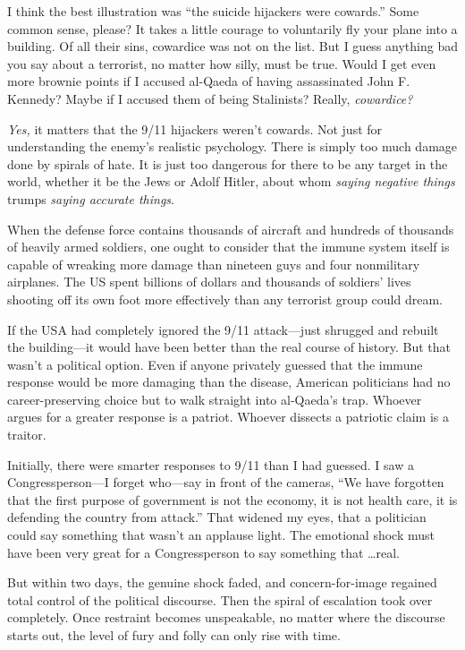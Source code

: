 {
 I think the best illustration was ``the suicide
hijackers were cowards.'' Some common sense, please?
It takes a little courage to voluntarily fly your plane into a
building. Of all their sins, cowardice was not on the list. But I guess
anything bad you say about a terrorist, no matter how silly, must be
true. Would I get even more brownie points if I accused al-Qaeda of
having assassinated John F. Kennedy? Maybe if I accused them of being
Stalinists? Really, \textit{cowardice?}}

{
 \textit{Yes,} it matters that the 9/11 hijackers
weren't cowards. Not just for understanding the
enemy's realistic psychology. There is simply too much
damage done by spirals of hate. It is just too dangerous for there to
be any target in the world, whether it be the Jews or Adolf Hitler,
about whom \textit{saying negative things} trumps \textit{saying
accurate things}.}

{
 When the defense force contains thousands of aircraft and hundreds
of thousands of heavily armed soldiers, one ought to consider that the
immune system itself is capable of wreaking more damage than nineteen
guys and four nonmilitary airplanes. The US spent billions of dollars
and thousands of soldiers' lives shooting off its own
foot more effectively than any terrorist group could dream.}

{
 If the USA had completely ignored the 9/11 attack---just shrugged
and rebuilt the building---it would have been better than the real
course of history. But that wasn't a political option.
Even if anyone privately guessed that the immune response would be more
damaging than the disease, American politicians had no
career-preserving choice but to walk straight into
al-Qaeda's trap. Whoever argues for a greater response
is a patriot. Whoever dissects a patriotic claim is a traitor.}

{
 Initially, there were smarter responses to 9/11 than I had
guessed. I saw a Congressperson---I forget who---say in front of the
cameras, ``We have forgotten that the first purpose of
government is not the economy, it is not health care, it is defending
the country from attack.'' That widened my eyes, that
a politician could say something that wasn't an
applause light. The emotional shock must have been very great for a
Congressperson to say something that \ldots real.}

{
 But within two days, the genuine shock faded, and
concern-for-image regained total control of the political discourse.
Then the spiral of escalation took over completely. Once restraint
becomes unspeakable, no matter where the discourse starts out, the
level of fury and folly can only rise with time.}

